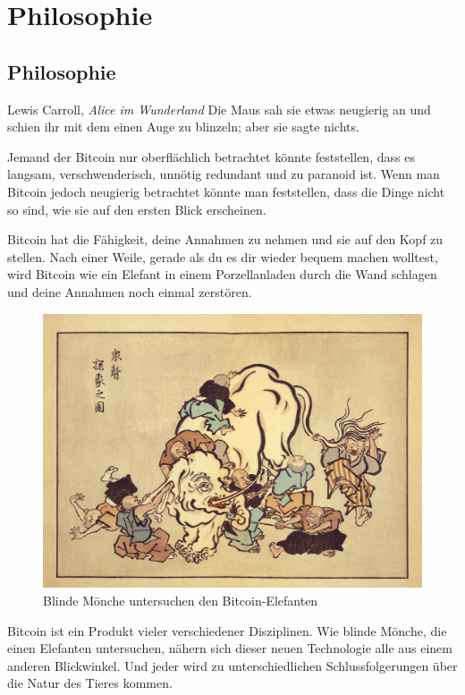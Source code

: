 \part{Philosophie}
\label{ch:philosophy}
\chapter*{Philosophie}

\begin{chapquote}{Lewis Carroll, \textit{Alice im Wunderland}}
Die Maus sah sie etwas neugierig an und schien ihr mit dem einen Auge zu
blinzeln; aber sie sagte nichts.
\end{chapquote}

Jemand der Bitcoin nur oberflächlich betrachtet könnte feststellen, dass es
langsam, verschwenderisch, unnötig redundant und zu paranoid ist. Wenn man
Bitcoin jedoch neugierig betrachtet könnte man feststellen, dass die Dinge nicht
so sind, wie sie auf den ersten Blick erscheinen.

Bitcoin hat die Fähigkeit, deine Annahmen zu nehmen und sie auf den Kopf zu
stellen. Nach einer Weile, gerade als du es dir wieder bequem machen wolltest,
wird Bitcoin wie ein Elefant in einem Porzellanladen durch die Wand schlagen und
deine Annahmen noch einmal zerstören.

\begin{figure}
  \includegraphics{assets/images/blind-monks.jpg}
  \caption{Blinde Mönche untersuchen den Bitcoin-Elefanten}
  \label{fig:blind-monks}
\end{figure}

Bitcoin ist ein Produkt vieler verschiedener Disziplinen. Wie blinde Mönche, die
einen Elefanten untersuchen, nähern sich dieser neuen Technologie alle aus einem
anderen Blickwinkel. Und jeder wird zu unterschiedlichen Schlussfolgerungen über
die Natur des Tieres kommen.

